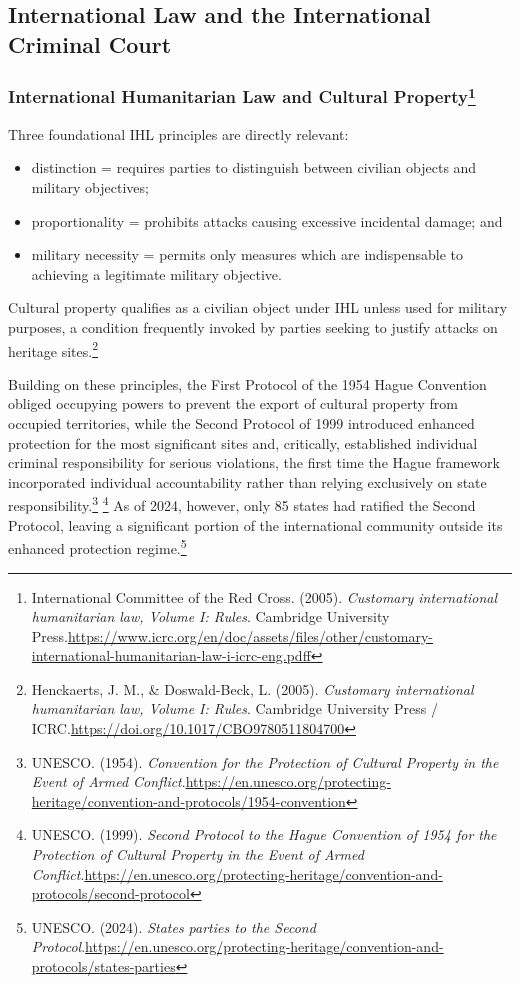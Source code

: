 \subsection{International Law and the International Criminal Court}

\subsubsection[International Humanitarian Law and Cultural Property]{International Humanitarian Law and Cultural Property\footnote{International Committee of the Red Cross. (2005). \emph{Customary international humanitarian law, Volume I: Rules}. Cambridge University Press.\url{https://www.icrc.org/en/doc/assets/files/other/customary-international-humanitarian-law-i-icrc-eng.pdf}f}}

Three foundational IHL principles are directly relevant:

\begin{itemize}
  \item distinction = requires parties to distinguish between civilian objects and military objectives;
  \item proportionality = prohibits attacks causing excessive incidental damage; and
  \item military necessity = permits only measures which are indispensable to achieving a legitimate military objective.
\end{itemize}

Cultural property qualifies as a civilian object under IHL unless used for military purposes, a condition frequently invoked by parties seeking to justify attacks on heritage sites.\footnote{Henckaerts, J. M., \& Doswald-Beck, L. (2005). \emph{Customary international humanitarian law, Volume I: Rules}. Cambridge University Press / ICRC.\url{https://doi.org/10.1017/CBO9780511804700}}

Building on these principles, the First Protocol of the 1954 Hague Convention obliged occupying powers to prevent the export of cultural property from occupied territories, while the Second Protocol of 1999 introduced enhanced protection for the most significant sites and, critically, established individual criminal responsibility for serious violations, the first time the Hague framework incorporated individual accountability rather than relying exclusively on state responsibility.\footnote{UNESCO. (1954). \emph{Convention for the Protection of Cultural Property in the Event of Armed Conflict}.\url{https://en.unesco.org/protecting-heritage/convention-and-protocols/1954-convention}} \footnote{UNESCO. (1999). \emph{Second Protocol to the Hague Convention of 1954 for the Protection of Cultural Property in the Event of Armed Conflict}.\url{https://en.unesco.org/protecting-heritage/convention-and-protocols/second-protocol}} As of 2024, however, only 85 states had ratified the Second Protocol, leaving a significant portion of the international community outside its enhanced protection regime.\footnote{UNESCO. (2024). \emph{States parties to the Second Protocol}.\url{https://en.unesco.org/protecting-heritage/convention-and-protocols/states-parties}}


